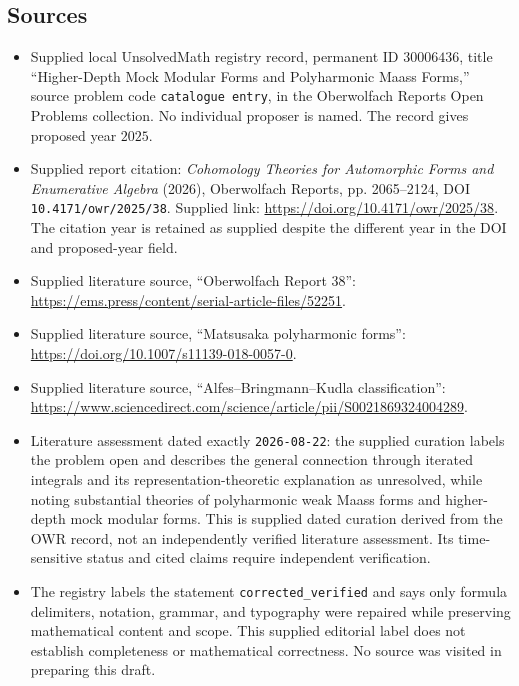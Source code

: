 \documentclass[11pt]{article}
\begin{document}
\subsection{Sources}
\begin{itemize}
\item Supplied local UnsolvedMath registry record, permanent ID \(30006436\), title ``Higher-Depth Mock Modular Forms and Polyharmonic Maass Forms,'' source problem code \texttt{catalogue entry}, in the Oberwolfach Reports Open Problems collection. No individual proposer is named. The record gives proposed year \(2025\).
\item Supplied report citation: \emph{Cohomology Theories for Automorphic Forms and Enumerative Algebra} (2026), Oberwolfach Reports, pp. 2065--2124, DOI \texttt{10.4171/owr/2025/38}. Supplied link: \url{https://doi.org/10.4171/owr/2025/38}. The citation year is retained as supplied despite the different year in the DOI and proposed-year field.
\item Supplied literature source, ``Oberwolfach Report 38'': \url{https://ems.press/content/serial-article-files/52251}.
\item Supplied literature source, ``Matsusaka polyharmonic forms'': \url{https://doi.org/10.1007/s11139-018-0057-0}.
\item Supplied literature source, ``Alfes--Bringmann--Kudla classification'': \url{https://www.sciencedirect.com/science/article/pii/S0021869324004289}.
\item Literature assessment dated exactly \texttt{2026-08-22}: the supplied curation labels the problem open and describes the general connection through iterated integrals and its representation-theoretic explanation as unresolved, while noting substantial theories of polyharmonic weak Maass forms and higher-depth mock modular forms. This is supplied dated curation derived from the OWR record, not an independently verified literature assessment. Its time-sensitive status and cited claims require independent verification.
\item The registry labels the statement \texttt{corrected\_verified} and says only formula delimiters, notation, grammar, and typography were repaired while preserving mathematical content and scope. This supplied editorial label does not establish completeness or mathematical correctness. No source was visited in preparing this draft.
\end{itemize}
\end{document}
